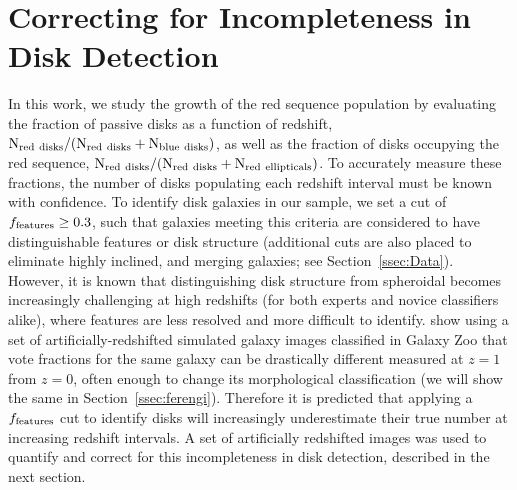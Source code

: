 \section{Correcting for Incompleteness in Disk Detection}
\label{sec:correction}
In this work, we study the growth of the red sequence population by evaluating the fraction of passive disks as a function of redshift, $\rm N_{red~disks}/(N_{red~disks}+N_{blue~disks})$, as well as the fraction of disks occupying the red sequence, $\rm N_{red~disks}/(N_{red~disks}+N_{red~ellipticals})$. To accurately measure these fractions, the number of disks populating each redshift interval must be known with confidence. To identify disk galaxies in our sample, we set a cut of $f_{\rm features}\ge0.3$, such that galaxies meeting this criteria are considered to have distinguishable features or disk structure (additional cuts are also placed to eliminate highly inclined, and merging galaxies; see Section~\ref{ssec:Data}). However, it is known that distinguishing disk structure from spheroidal becomes increasingly challenging at high redshifts (for both experts and novice classifiers alike), where features are less resolved and more difficult to identify. \citet{Willett2016} show using a set of artificially-redshifted simulated galaxy images classified in Galaxy Zoo that vote fractions for the same galaxy can be drastically different measured at $z=1$ from $z=0$, often enough to change its morphological classification (we will show the same in Section~\ref{ssec:ferengi}).  Therefore it is predicted that applying a $f_{\rm features}$ cut to identify disks will increasingly underestimate their true number at increasing redshift intervals. A set of artificially redshifted images was used to quantify and correct for this incompleteness in disk detection, described in the next section.

